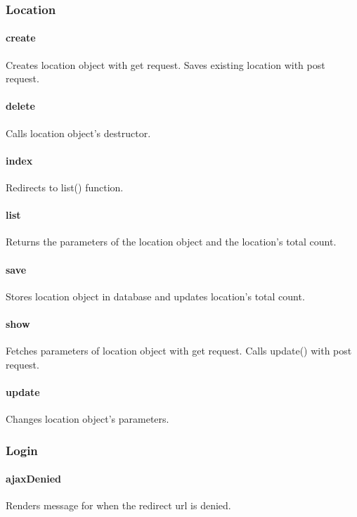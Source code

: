 \documentclass[12pt]{article}
\begin{document}
\subsubsection{Location}\label{sec:CLocation}
\paragraph{create} Creates location object with get request. Saves existing location with post request.
\paragraph{delete} Calls location object's destructor.
\paragraph{index} Redirects to list() function.
\paragraph{list} Returns the parameters of the location object and the location's total count.
\paragraph{save} Stores location object in database and updates location's total count.
\paragraph{show} Fetches parameters of location object with get request. Calls update() with post request.
\paragraph{update} Changes location object's parameters.

\subsubsection{Login}\label{sec:CLogin}
\paragraph{ajaxDenied} Renders message for when the redirect url is denied.
\end{document}
